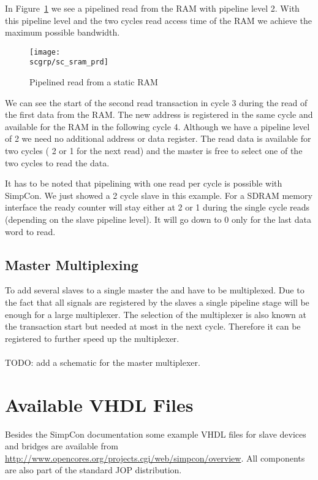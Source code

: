 In Figure~\ref{fig:sc:sram:prd} we see a pipelined read from the RAM
with pipeline level 2. With this pipeline level and the two cycles
read access time of the RAM we achieve the maximum possible
bandwidth.

\begin{figure}
    \centering
    \texttt{[image: \\scgrp/sc\_sram\_prd]}
    \caption{Pipelined read from a static RAM}
    \label{fig:sc:sram:prd}
\end{figure}

We can see the start of the second read transaction in cycle 3
during the read of the first data from the RAM. The new address is
registered in the same cycle and available for the RAM in the
following cycle 4. Although we have a pipeline level of 2 we need no
additional address or data register. The read data is available for
two cycles ( 2 or 1 for the next read) and the master
is free to select one of the two cycles to read the data.

It has to be noted that pipelining with one read per cycle is
possible with SimpCon. We just showed a 2 cycle slave in this
example. For a SDRAM memory interface the ready counter will stay
either at 2 or 1 during the single cycle reads (depending on the
slave pipeline level). It will go down to 0 only for the last data
word to read.

\subsection{Master Multiplexing}

To add several slaves to a single master the  and
 have to be multiplexed. Due to the fact that all
 signals are registered by the slaves a single
pipeline stage will be enough for a large multiplexer. The selection
of the multiplexer is also known at the transaction start but needed
at most in the next cycle. Therefore it can be registered to further
speed up the multiplexer.
\ \\
\ \\
TODO: add a schematic for the master  multiplexer.

\section{Available VHDL Files}

Besides the SimpCon documentation some example VHDL files for slave
devices and bridges are available from
\url{http://www.opencores.org/projects.cgi/web/simpcon/overview}.
All components are also part of the standard JOP distribution.


